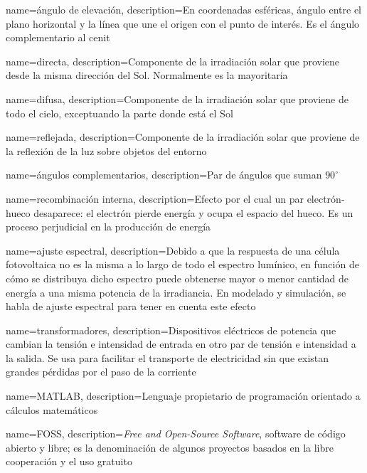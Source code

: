 {
    name={ángulo de elevación},
    description={En \gls{coordenadas esféricas}, ángulo entre el plano horizontal y la línea que une el origen con el punto de interés. Es el ángulo complementario al \gls{cenit}}
}

{
    name={directa},
    description={Componente de la irradiación solar que proviene desde la misma dirección del Sol. Normalmente es la mayoritaria}
}

{
    name={difusa},
    description={Componente de la irradiación solar que proviene de todo el cielo, exceptuando la parte donde está el Sol}
}

{
    name={reflejada},
    description={Componente de la irradiación solar que proviene de la reflexión de la luz sobre objetos del entorno}
}

{
    name={ángulos complementarios},
    description={Par de ángulos que suman $90^\circ$}
}

{
    name={recombinación interna},
    description={Efecto por el cual un \gls{par electrón-hueco} desaparece: el electrón pierde energía y ocupa el espacio del hueco. Es un proceso perjudicial en la producción de energía}
}

{
    name={ajuste espectral},
    description={Debido a que la respuesta de una célula fotovoltaica no es la misma a lo largo de todo el espectro lumínico, en función de cómo se distribuya dicho espectro puede obtenerse mayor o menor cantidad de energía a una misma potencia de la irradiancia. En modelado y simulación, se habla de ajuste espectral para tener en cuenta este efecto}
}

{
    name={transformadores},
    description={Dispositivos eléctricos de potencia que cambian la tensión e intensidad de entrada en otro par de tensión e intensidad a la salida. Se usa para facilitar el transporte de electricidad sin que existan grandes pérdidas por el paso de la corriente}
}

{
    name={MATLAB},
    description={Lenguaje propietario de programación orientado a cálculos matemáticos}
}

{
    name={FOSS},
    description={\textit{Free and Open-Source Software}, \Gls{software} de código abierto y libre; es la denominación de algunos proyectos basados en la libre cooperación y el uso gratuito}
}

